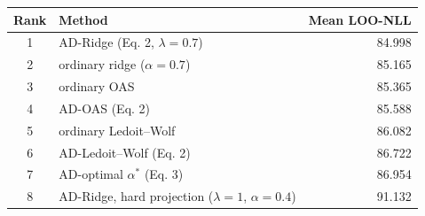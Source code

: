 \begin{tabular}{clr}
\toprule
Rank & Method & Mean LOO-NLL\\
\midrule
1 & AD-Ridge (Eq. 2, $\lambda=0.7$) & 84.998\\
2 & ordinary ridge ($\alpha=0.7$) & 85.165\\
3 & ordinary OAS & 85.365\\
4 & AD-OAS (Eq. 2) & 85.588\\
5 & ordinary Ledoit--Wolf & 86.082\\
6 & AD-Ledoit--Wolf (Eq. 2) & 86.722\\
7 & AD-optimal $\alpha^\ast$ (Eq. 3) & 86.954\\
8 & AD-Ridge, hard projection ($\lambda=1$, $\alpha=0.4$) & 91.132\\
\bottomrule
\end{tabular}
